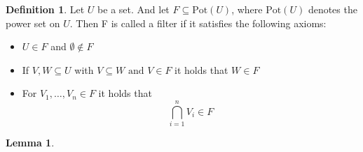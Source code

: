 \documentclass[12pt,a4paper,BCOR15mm,twoside,DIV12]{article}
\theoremstyle{definition}
\newtheorem{defn}[Satz]{Definition}
\newtheorem{lem}[Satz]{Lemma}
\begin{document}
\begin{defn}
Let $U$ be a set. And let $F \subseteq \text{Pot}(U)$, where $\text{Pot}(U)$ denotes the power set on $U$. Then F is called a filter if it satisfies the following axioms: 
\begin{itemize}
\item  $U \in F$ and $\emptyset \notin F$
\item If $V,W \subseteq U$ with $V \subseteq W \text{ and }V  \in F $ it holds that $W \in F$
\item For $V_1, \ldots, V_n \in F$ it holds that \[ \bigcap_{i = 1}^n V_i \in F \]
\end{itemize}
\end{defn}

\begin{lem}

\end{lem}
\end{document}
